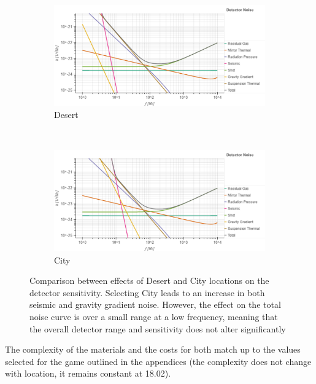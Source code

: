 \documentclass{article}
\begin{document}
    
    \begin{figure}[h!]
\centering
\begin{subfigure}{.8\textwidth}
        \centering
\includegraphics[width=1\linewidth, trim = {0 0 0 1cm}, clip]{aLIGODesert.pdf}
         \caption{Desert}
         \label{fig::PowerStages}
         \end{subfigure}%
         \\
        \begin{subfigure}{.8\textwidth}
        \centering
        \includegraphics[width=1\linewidth, trim = {0 0 0 0.9cm}, clip]{aLIGOCity.pdf}
\caption{City}
          \label{fig::aLIGODesertCity}
         \end{subfigure}
         \caption{Comparison between effects of Desert and City
           locations on the detector sensitivity. Selecting City leads
           to an increase in both seismic and gravity gradient
           noise. However, the effect on the total noise curve is over
           a small range at a low frequency, meaning that the overall
           detector range and sensitivity does not alter
           significantly}
         \label{fig::aLIGOSiliconCrystal}
 \end{figure}
 
 The complexity of the materials and the costs for both match up to
 the values selected for the game outlined in the appendices (the
 complexity does not change with location, it remains constant at
 18.02). 
\end{document}
